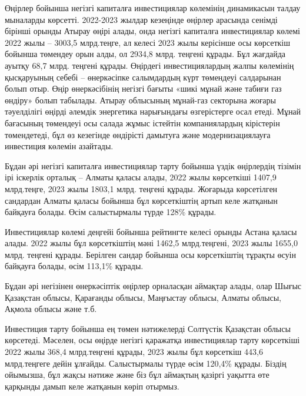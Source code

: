 \begin{multicols}{2}
Өңірлер бойынша негізгі капиталға инвестициялар көлемінің динамикасын
талдау мыналарды көрсетті. 2022-2023 жылдар кезеңінде өңірлер арасында
сенімді бірінші орынды Атырау өңірі алады, онда негізгі капиталға
инвестициялар көлемі 2022 жылы -- 3003,5 млрд.теңге, ал келесі 2023 жылы
керісінше осы көрсеткіш бойынша төмендеу орын алды, ол 2934,8 млрд.
теңгені құрады. Бұл жағдайда ауытқу 68,7 млрд. теңгені құрады. Өңірдегі
инвестициялардың жалпы көлемінің қысқаруының себебі -- өнеркәсіпке
салымдардың күрт төмендеуі салдарынан болып отыр. Өңір өнеркәсібінің
негізгі бағыты «шикі мұнай және табиғи газ өндіру» болып табылады.
Атырау облысының мұнай-газ секторына жоғары тәуелділігі өңірді әлемдік
энергетика нарығындағы өзгерістерге осал етеді. Мұнай бағасының
төмендеуі осы салада жұмыс істейтін компаниялардың кірістерін
төмендетеді, бұл өз кезегінде өндірісті дамытуға және модернизациялауға
инвестиция көлемін азайтады.

Бұдан әрі негізгі капиталға инвестициялар тарту бойынша үздік өңірлердің
тізімін ірі іскерлік орталық -- Алматы қаласы алады, 2022 жылы
көрсеткіші 1407,9 млрд.теңге, 2023 жылы 1803,1 млрд. теңгені құрады.
Жоғарыда көрсетілген сандардан Алматы қаласы бойынша бұл көрсеткіштің
артып келе жатқанын байқауға болады. Өсім салыстырмалы түрде 128\%
құрады.

Инвестициялар көлемі деңгейі бойынша рейтингте келесі орынды Астана
қаласы алады. 2022 жылы бұл көрсеткіштің мәні 1462,5 млрд.теңгені, 2023
жылы 1655,0 млрд. теңгені құрады. Берілген сандар бойынша осы
көрсеткіштің тұрақты өсуін байқауға болады, өсім 113,1\% құрады.

Бұдан әрі негізінен өнеркәсіптік өңірлер орналасқан аймақтар алады, олар
Шығыс Қазақстан облысы, Қарағанды облысы, Маңғыстау облысы, Алматы
облысы, Ақмола облысы және т.б.

Инвестиция тарту бойынша ең төмен нәтижелерді Солтүстік Қазақстан облысы
көрсетеді. Мәселен, осы өңірде негізгі қаражатқа инвестициялар тарту
көрсеткіші 2022 жылы 368,4 млрд.теңгені құрады, 2023 жылы бұл көрсеткіш
443,6 млрд.теңгеге дейін ұлғайды. Салыстырмалы түрде өсім 120,4\%
құрады. Біздің ойымызша, бұл жақсы нәтиже және біз бұл аймақтың қазіргі
уақытта өте қарқынды дамып келе жатқанын көріп отырмыз.
\end{multicols}


